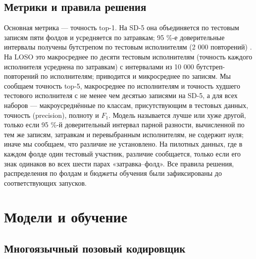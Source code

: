 \hypertarget{ux43cux435ux442ux440ux438ux43aux438-ux438-ux43fux440ux430ux432ux438ux43bux430-ux440ux435ux448ux435ux43dux438ux44f}{%
\subsection{Метрики и правила решения}\label{ux43cux435ux442ux440ux438ux43aux438-ux438-ux43fux440ux430ux432ux438ux43bux430-ux440ux435ux448ux435ux43dux438ux44f}}

Основная метрика --- точность top-1. На SD-5 она объединяется по тестовым записям пяти фолдов и усредняется по затравкам; 95 \%-е доверительные интервалы получены бутстрепом по тестовым исполнителям (2 000 повторений) \citep{2016_efron_hastie_casi}. На LOSO это макросреднее по десяти тестовым исполнителям (точность каждого исполнителя усреднена по затравкам) с интервалами из 10 000 бутстреп-повторений по исполнителям; приводится и микросреднее по записям. Мы сообщаем точность top-5, макросреднее по исполнителям и точность худшего тестового исполнителя с не менее чем десятью записями на SD-5, а для всех наборов --- макроусреднённые по классам, присутствующим в тестовых данных, точность (precision), полноту и \(F_1\). Модель называется лучше или хуже другой, только если 95 \%-й доверительный интервал парной разности, вычисленной по тем же записям, затравкам и перевыбранным исполнителям, не содержит нуля; иначе мы сообщаем, что различие не установлено. На пилотных данных, где в каждом фолде один тестовый участник, различие сообщается, только если его знак одинаков во всех шести парах «затравка--фолд». Все правила решения, распределения по фолдам и бюджеты обучения были зафиксированы до соответствующих запусков.

\hypertarget{ux43cux43eux434ux435ux43bux438-ux438-ux43eux431ux443ux447ux435ux43dux438ux435}{%
\section{Модели и обучение}\label{ux43cux43eux434ux435ux43bux438-ux438-ux43eux431ux443ux447ux435ux43dux438ux435}}

\hypertarget{ux43cux43dux43eux433ux43eux44fux437ux44bux447ux43dux44bux439-ux43fux43eux437ux43eux432ux44bux439-ux43aux43eux434ux438ux440ux43eux432ux449ux438ux43a}{%
\subsection{Многоязычный позовый кодировщик}\label{ux43cux43dux43eux433ux43eux44fux437ux44bux447ux43dux44bux439-ux43fux43eux437ux43eux432ux44bux439-ux43aux43eux434ux438ux440ux43eux432ux449ux438ux43a}}

